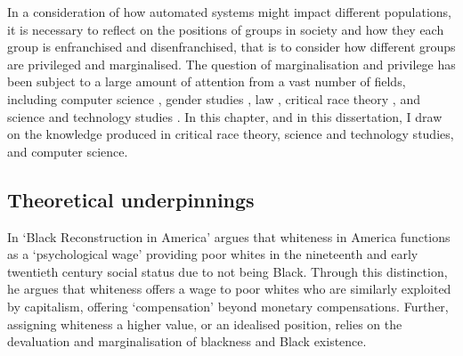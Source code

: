 In a consideration of how automated systems might impact different populations, it is necessary to reflect on the positions of groups in society and how they each group is enfranchised and disenfranchised, that is to consider how different groups are privileged and marginalised.
The question of marginalisation and privilege has been subject to a large amount of attention from a vast number of fields, including computer science \citep{Bender:2021,Dinan:2019,Mitchell:2019}, gender studies \citep{McIntosh:1988,Mohanty:1984}, law \citep{Crenshaw:1989}, critical race theory \citep{Benjamin:2019,Myers:2019}, and science and technology studies \citep{Haraway:1988}.
In this chapter, and in this dissertation, I draw on the knowledge produced in critical race theory, science and technology studies, and computer science.

\subsection{Theoretical underpinnings}

In `Black Reconstruction in America' \citet{Dubois:1935} argues that whiteness in America functions as a `psychological wage' providing poor whites in the nineteenth and early twentieth century social status due to not being Black. Through this distinction, he argues that whiteness offers a wage to poor whites who are similarly exploited by capitalism, offering `compensation' beyond monetary compensations. Further, assigning whiteness a higher value, or an idealised position, relies on the devaluation and marginalisation of blackness and Black existence.


